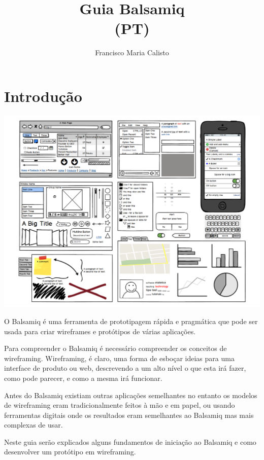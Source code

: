 \documentclass{tufte-book} %
\title{Guia Balsamiq\\(PT)}
\author[Professor]{Francisco Maria Calisto}
\begin{document}
\maketitle

\tableofcontents

\cleardoublepage
\chapter*{Introdução}

\begin{center}
	\includegraphics[width=15cm]{img1.png}
\end{center}

O Balsamiq é uma ferramenta de prototipagem rápida e pragmática que pode ser usada para criar wireframes e protótipos de várias aplicações.

Para compreender o Balsamiq é necessário compreender os conceitos de wireframing. Wireframing, é claro, uma forma de esboçar ideias para uma interface de produto ou web, descrevendo a um alto nível o que esta irá fazer, como pode parecer, e como a mesma irá funcionar.

Antes do Balsamiq existiam outras aplicações semelhantes no entanto os modelos de wireframing eram tradicionalmente feitos à mão e em papel, ou usando ferramentas digitais onde os resultados eram semelhantes ao Balsamiq mas mais complexas de usar.

Neste guia serão explicados alguns fundamentos de iniciação ao Balsamiq e como desenvolver um protótipo em wireframing.
\end{document}
